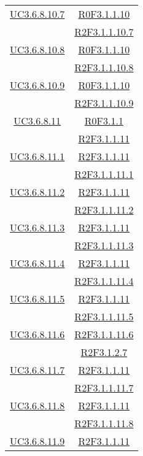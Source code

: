 \begin{longtable}{|c|c|}
\hline
\hyperlink{UC3.6.8.10.7}{UC3.6.8.10.7} & \hyperlink{R0F3.1.1.10}{R0F3.1.1.10}\\
& \hyperlink{R2F3.1.1.10.7}{R2F3.1.1.10.7}\\
\hline
\hyperlink{UC3.6.8.10.8}{UC3.6.8.10.8} & \hyperlink{R0F3.1.1.10}{R0F3.1.1.10}\\
& \hyperlink{R2F3.1.1.10.8}{R2F3.1.1.10.8}\\
\hline
\hyperlink{UC3.6.8.10.9}{UC3.6.8.10.9} & \hyperlink{R0F3.1.1.10}{R0F3.1.1.10}\\
& \hyperlink{R2F3.1.1.10.9}{R2F3.1.1.10.9}\\
\hline
\hyperlink{UC3.6.8.11}{UC3.6.8.11} & \hyperlink{R0F3.1.1}{R0F3.1.1}\\
& \hyperlink{R2F3.1.1.11}{R2F3.1.1.11}\\
\hline
\hyperlink{UC3.6.8.11.1}{UC3.6.8.11.1} & \hyperlink{R2F3.1.1.11}{R2F3.1.1.11}\\
& \hyperlink{R2F3.1.1.11.1}{R2F3.1.1.11.1}\\
\hline
\hyperlink{UC3.6.8.11.2}{UC3.6.8.11.2} & \hyperlink{R2F3.1.1.11}{R2F3.1.1.11}\\
& \hyperlink{R2F3.1.1.11.2}{R2F3.1.1.11.2}\\
\hline
\hyperlink{UC3.6.8.11.3}{UC3.6.8.11.3} & \hyperlink{R2F3.1.1.11}{R2F3.1.1.11}\\
& \hyperlink{R2F3.1.1.11.3}{R2F3.1.1.11.3}\\
\hline
\hyperlink{UC3.6.8.11.4}{UC3.6.8.11.4} & \hyperlink{R2F3.1.1.11}{R2F3.1.1.11}\\
& \hyperlink{R2F3.1.1.11.4}{R2F3.1.1.11.4}\\
\hline
\hyperlink{UC3.6.8.11.5}{UC3.6.8.11.5} & \hyperlink{R2F3.1.1.11}{R2F3.1.1.11}\\
& \hyperlink{R2F3.1.1.11.5}{R2F3.1.1.11.5}\\
\hline
\hyperlink{UC3.6.8.11.6}{UC3.6.8.11.6} & \hyperlink{R2F3.1.1.11.6}{R2F3.1.1.11.6}\\
& \hyperlink{R2F3.1.2.7}{R2F3.1.2.7}\\
\hline
\hyperlink{UC3.6.8.11.7}{UC3.6.8.11.7} & \hyperlink{R2F3.1.1.11}{R2F3.1.1.11}\\
& \hyperlink{R2F3.1.1.11.7}{R2F3.1.1.11.7}\\
\hline
\hyperlink{UC3.6.8.11.8}{UC3.6.8.11.8} & \hyperlink{R2F3.1.1.11}{R2F3.1.1.11}\\
& \hyperlink{R2F3.1.1.11.8}{R2F3.1.1.11.8}\\
\hline
\hyperlink{UC3.6.8.11.9}{UC3.6.8.11.9} & \hyperlink{R2F3.1.1.11}{R2F3.1.1.11}\\

\end{longtable}
